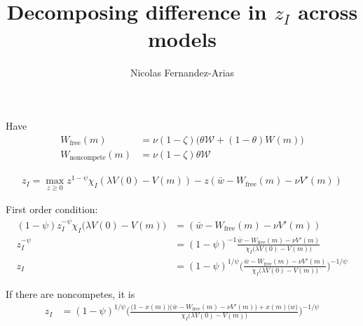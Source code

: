 \documentclass[12pt,english]{article}
\theoremstyle{remark}
\begin{document}
	
	
	
\title{Decomposing difference in $z_I$ across models}
\author{Nicolas Fernandez-Arias}
\maketitle

Have
\begin{align*}
	W_{\text{free}}(m) &= \nu (1-\zeta) \Big(\theta \mathcal{W} + (1-\theta) W(m) \Big)  \\
	W_{\text{noncompete}}(m) &= \nu (1-\zeta) \theta \mathcal{W}
\end{align*}

\begin{align*}
	z_I = \max_{z \ge 0} z^{1-\psi} \chi_I(\lambda V(0) - V(m)) - z (\bar{w} - W_{\text{free}}(m) - \nu V'(m)) 
\end{align*}

First order condition:
\begin{align*}
	(1-\psi) z_I^{-\psi} \chi_I \Big( \lambda V(0) - V(m) \Big) &= (\bar{w} - W_{\text{free}}(m) - \nu V'(m)) \\
	z_I^{-\psi} &= (1-\psi)^{-1}  \frac{\bar{w} - W_{\text{free}}(m) - \nu V'(m)}{\chi_I \Big( \lambda V(0) - V(m) \Big)} \\
	z_I &= (1-\psi)^{1/\psi} \Bigg( \frac{\bar{w} - W_{\text{free}}(m) - \nu V'(m)}{\chi_I \Big( \lambda V(0) - V(m) \Big)}\Bigg)^{-1/\psi} 
\end{align*}

If there are noncompetes, it is
\begin{align*}
	z_I &= (1-\psi)^{1/\psi} \Bigg( \frac{\Big(1-x(m)\Big) \Big(\bar{w} - W_{\text{free}}(m) - \nu V'(m) \Big) + x(m) \Big( w \Big)}{\chi_I \Big( \lambda V(0) - V(m) \Big)}\Bigg)^{-1/\psi} 	
\end{align*}
\end{document}
